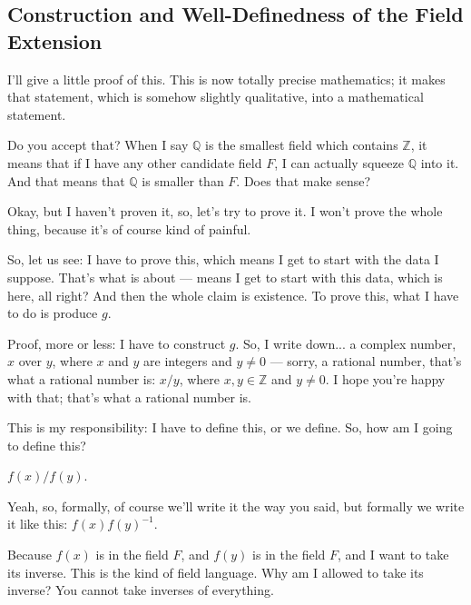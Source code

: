 \subsection{Construction and Well-Definedness of the Field Extension}

\begin{speech}[00:19:32 - 00:21:20]
I'll give a little proof of this. This is now totally precise mathematics; it makes that statement, which is somehow slightly qualitative, into a mathematical statement.

Do you accept that? When I say $\mathbb{Q}$ is the smallest field which contains $\mathbb{Z}$, it means that if I have any other candidate field $F$, I can actually squeeze $\mathbb{Q}$ into it. And that means that $\mathbb{Q}$ is smaller than $F$. Does that make sense?

Okay, but I haven't proven it, so, let's try to prove it. I won't prove the whole thing, because it's of course kind of painful.

So, let us see: I have to prove this, which means I get to start with the data I suppose. That's what  is about ---  means I get to start with this data, which is here, all right? And then the whole claim is existence. To prove this, what I have to do is produce $g$.

Proof, more or less:  I have to construct $g$. So, I write down...  a complex number, $x$ over $y$, where $x$ and $y$ are integers and $y \neq 0$ --- sorry, a rational number, that's what a rational number is: $x/y$, where $x, y \in \mathbb{Z}$ and $y \neq 0$.  I hope you're happy with that; that's what a rational number is.

This is my responsibility: I have to define this, or we define.  So, how am I going to define this?
\end{speech}

\begin{student}
$f(x) / f(y)$.
\end{student}

\begin{speech}[00:21:23 - 00:21:51]
Yeah, so, formally, of course we'll write it the way you said, but formally we write it like this:  $f(x) f(y)^{-1}$.

Because $f(x)$ is in the field $F$, and $f(y)$ is in the field $F$, and I want to take its inverse. This is the kind of field language. Why am I allowed to take its inverse? You cannot take inverses of everything.
\end{speech}


